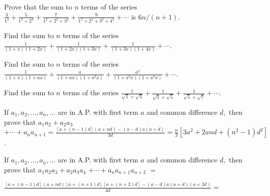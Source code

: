 \item Prove that the sum to $n$ terms of the series $\frac{3}{1^2} + \frac{5}{1^2 + 2^2} + \frac{7}{1^2 + 2^2 + 3^2} +
  \frac{9}{1^2 + 2^2 + 3^2 + 4^2} + \cdots$ is $6n/(n + 1)$.
\item Find the sum to $n$ terms of the series $\frac{1}{(1 + x)(1 + 2x)} + \frac{1}{(1 + 2x)(1 + 3x)} + \frac{1}{(1 +
  3x)(1 + 4x)} + \cdots$.
\item Find the sum to $n$ terms of the series $\frac{1}{(1 + x)(1 + ax)} + \frac{a}{(1 + ax)(1 + a^2x)} + \frac{a^2}{(1 +
  a^2x)(1 + a^3x)} + \cdots$.
\item Find the sum to $n$ terms of the series $\frac{1}{\sqrt{1} + \sqrt{3}} + \frac{1}{\sqrt{3} + \sqrt{5}} +
  \frac{1}{\sqrt{5} + \sqrt{7}} + \cdots$.
\item If $a_1, a_2, \ldots, a_n, \ldots$ are in A.P. with first term $a$ and common difference $d,$ then prove that
  $a_1a_2 + a_2a_3$ $+ \cdots + a_na_{n +1} = \frac{[a + (n - 1)d](a + nd) - (a - d)a(a + d)}{3d} = \frac{n}{3}[3a^2 + 2and + (n^2
  - 1)d^2]$.
\item If $a_1, a_2, \ldots, a_n, \ldots$ are in A.P. with first term $a$ and common difference $d,$ then prove that
  $a_1a_2a_3 + a_2a_3a_4$ $+ \cdots + a_na_{n +1}a_{n + 2}$ $=$

  $\frac{[a + (n - 1)d](a + nd)[a + (n + 1)d][a + (n + 2)d] - (a -
  d)a(a + d)(a + 2d)}{4d}=$

